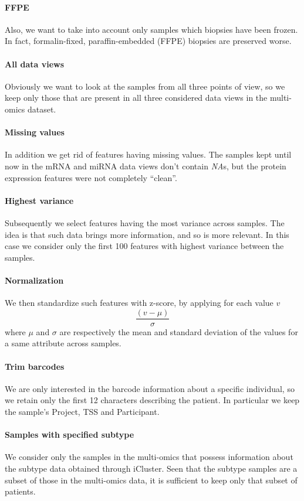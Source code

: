 \paragraph{FFPE} Also, we want to take into account only samples which biopsies have been frozen. In fact, formalin-fixed, paraffin-embedded (FFPE) biopsies are preserved worse.
\paragraph{All data views} Obviously we want to look at the samples from all three points of view, so we keep only those that are present in all three considered data views in the multi-omics dataset.
\paragraph{Missing values} In addition we get rid of features having missing values. The samples kept until now in the mRNA and miRNA data views don't contain \textit{NA}s, but the protein expression features were not completely ``clean''.\
\paragraph{Highest variance} Subsequently we select features having the most variance across samples. The idea is that such data brings more information, and so is more relevant. In this case we consider only the first 100 features with highest variance between the samples.
\paragraph{Normalization} We then standardize such features with z-score, by applying for each value $v$
\begin{equation}
    \frac{(v-\mu)}{\sigma}
\end{equation}
where $\mu$ and $\sigma$ are respectively the mean and standard deviation of the values for a same attribute across samples.
\paragraph{Trim barcodes} We are only interested in the barcode information about a specific individual, so we retain only the first 12 characters describing the patient. In particular we keep the sample's Project, TSS and Participant.
\paragraph{Samples with specified subtype} We consider only the samples in the multi-omics that possess information about the subtype data obtained through iCluster. Seen that the subtype samples are a subset of those in the multi-omics data, it is sufficient to keep only that subset of patients.

